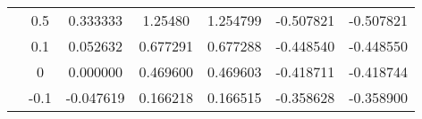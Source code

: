 \begin{threeparttable}
\begin{tabular}{S[table-format=1.1] S[table-format=-1.1] S[table-format=-1.6] S[table-format=1.6] S[table-format=1.6] S[table-format=-1.6] S[table-format=-1.6]}
                  &   0.5       &   0.333333            &  1.25480   &  1.254799   &  -0.507821   &  -0.507821  \\
                  &   0.1       &   0.052632            &  0.677291   &  0.677288   &  -0.448540   &  -0.448550  \\
                  &   0       &   0.000000            &  0.469600   &  0.469603   &  -0.418711   &  -0.418744  \\
                  &   -0.1       &   -0.047619            &  0.166218   &  0.166515   &  -0.358628   &  -0.358900  \\
        \bottomrule

    \end{tabular}
\end{threeparttable}
